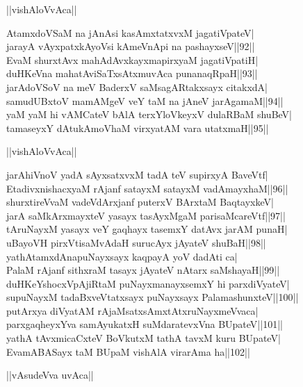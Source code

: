 \documentclass{article}
\begin{document}
\begin{center}
||vishAloVvAca||
\end{center}

AtamxdoVSaM na jAnAsi kasAmxtatxvxM jagatiVpateV|\\
jarayA vAyxpatxkAyoVsi kAmeVnApi na pashayxseV||92||\\
EvaM shurxtAvx mahAdAvxkayxmapirxyaM jagatiVpatiH|\\
duHKeVna mahatAviSaTxsAtxmuvAca punanaqRpaH||93||\\
jarAdoVSoV na meV BaderxV saMsagARtakxsayx citakxdA|\\
samudUBxtoV mamAMgeV veY taM na jAneV jarAgamaM||94||\\
yaM yaM hi vAMCateV bAlA terxYloVkeyxV dulaRBaM shuBeV|\\
tamaseyxY dAtukAmoVhaM virxyatAM vara utatxmaH||95||\\

\begin{center}
||vishAloVvAca||
\end{center}

jarAhiVnoV yadA sAyxsatxvxM tadA teV supirxyA BaveVtf|\\
EtadivxnishacxyaM rAjanf satayxM satayxM vadAmayxhaM||96||\\
shurxtireVvaM vadeVdArxjanf puterxV BArxtaM BaqtayxkeV|\\
jarA saMkArxmayxteV yasayx tasAyxMgaM parisaMcareVtf||97||\\
tAruNayxM yasayx veY gaqhayx tasemxY datAvx jarAM punaH|\\
uBayoVH pirxVtisaMvAdaH surucAyx jAyateV shuBaH||98||\\
yathAtamxdAnapuNayxsayx kaqpayA yoV dadAti ca|\\
PalaM rAjanf sithxraM tasayx jAyateV nAtarx saMshayaH||99||\\
duHKeYshocxVpAjiRtaM puNayxmanayxsemxY hi parxdiVyateV|\\
supuNayxM tadaBxveVtatxsayx puNayxsayx PalamashunxteV||100||\\
putArxya diVyatAM rAjaMsatxsAmxtAtxruNayxmeVvaca|\\
parxgaqheyxYva samAyukatxH suMdaratevxVna BUpateV||101||\\
yathA tAvxmicaCxteV BoVkutxM tathA tavxM kuru BUpateV|\\
EvamABASayx taM BUpaM vishAlA virarAma ha||102||\\

\begin{center}
||vAsudeVva uvAca||
\end{center}
\end{document}
